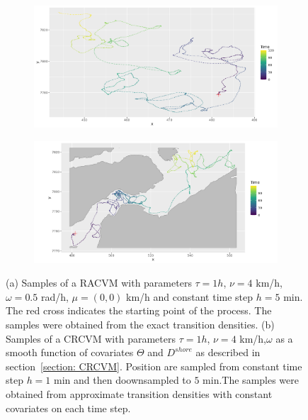 \documentclass[11pt]{article}
\newcommand {\1}{\mathbb{1}}
\begin{document}

\begin{figure}[H]
	\centering
	\begin{subfigure}{0.48\textwidth}
		\centering
		\includegraphics[scale=0.3]{images/illustrative_sample_standard.png}
		\caption{}
	\end{subfigure}
	\begin{subfigure}{0.48\textwidth}
		\centering
		\includegraphics[scale=0.3]{images/illustrative_sample_fjords.png}
		\caption{}
	\end{subfigure}
	\caption{(a) Samples of a RACVM with parameters $\tau=1 h$, $\nu=4$ km/h,$\omega=0.5$ rad/h, $\mu=(0,0)$ km/h and constant time step $h=5$ min. The red cross indicates the starting point of the process. The samples were obtained from the exact transition densities. (b) Samples of a CRCVM with parameters $\tau=1 h$, $\nu=4$ km/h,$\omega$ as a smooth function of covariates $\Theta$ and $D^{shore}$ as described in section~\ref{section: CRCVM}. Position are sampled from constant time step $h= 1$ min and then doownsampled to $5$ min.The samples were obtained from approximate transition densities  with constant covariates on each time step. }
	\label{fig: sample RACVM}
\end{figure}
\end{document}
